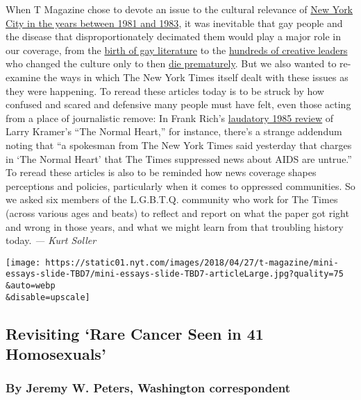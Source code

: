 When T Magazine chose to devote an issue to the cultural relevance of
\href{https://www.nytimes.com/interactive/2018/04/17/t-magazine/new-york-1980s-culture.html}{New
York City in the years between 1981 and 1983}, it was inevitable that
gay people and the disease that disproportionately decimated them would
play a major role in our coverage, from the
\href{https://www.nytimes.com/2018/04/16/t-magazine/gay-literature-1980s.html}{birth
of gay literature} to the
\href{https://www.nytimes.com/2018/04/19/t-magazine/keith-haring-tina-chow-aids-resurrected.html}{hundreds
of creative leaders} who changed the culture only to then
\href{https://www.nytimes.com/interactive/2018/04/17/t-magazine/aids-epidemic-deaths-new-york.html}{die
prematurely}. But we also wanted to re-examine the ways in which The New
York Times itself dealt with these issues as they were happening. To
reread these articles today is to be struck by how confused and scared
and defensive many people must have felt, even those acting from a place
of journalistic remove: In Frank Rich's
\href{https://www.nytimes.com/1985/04/22/theater/theater-the-normal-heart-by-larry-kramer.html}{laudatory
1985 review} of Larry Kramer's ``The Normal Heart,'' for instance,
there's a strange addendum noting that ``a spokesman from The New York
Times said yesterday that charges in `The Normal Heart' that The Times
suppressed news about AIDS are untrue.'' To reread these articles is
also to be reminded how news coverage shapes perceptions and policies,
particularly when it comes to oppressed communities. So we asked six
members of the L.G.B.T.Q. community who work for The Times (across
various ages and beats) to reflect and report on what the paper got
right and wrong in those years, and what we might learn from that
troubling history today. \emph{--- Kurt Soller}

\texttt{[image: https://static01.nyt.com/images/2018/04/27/t-magazine/mini-essays-slide-TBD7/mini-essays-slide-TBD7-articleLarge.jpg?quality=75\\\&auto=webp\\\&disable=upscale]}

\hypertarget{revisiting-rare-cancer-seen-in-41-homosexuals}{%
\subsection{Revisiting `Rare Cancer Seen in 41
Homosexuals'}\label{revisiting-rare-cancer-seen-in-41-homosexuals}}

\hypertarget{by-jeremy-w-peters-washington-correspondent}{%
\subsubsection{By Jeremy W. Peters, Washington
correspondent}\label{by-jeremy-w-peters-washington-correspondent}}

